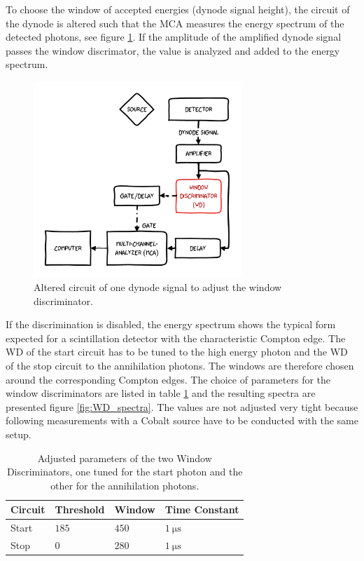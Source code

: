 \documentclass[
	paper=A4,
	parskip=full,
	chapterprefix=true,
	11pt,
	headings=normal,
	bibliography=totoc,
	listof=totoc,
	titlepage=on,
]{scrreprt}
\begin{document}
To choose the window of accepted energies (dynode signal height), the circuit of the dynode is altered such that the MCA measures the energy spectrum of the detected photons, see figure \ref{fig:WD_circuit}. If the amplitude of the amplified dynode signal passes the window discrimator, the value is analyzed and added to the energy spectrum. 
 
\begin{figure}[h]
 	\centering
 	\includegraphics[width=0.7\textwidth]{aufbau_wd}
 	\caption{Altered circuit of one dynode signal to adjust the window discriminator.}
	\label{fig:WD_circuit}
\end{figure}
 
If the discrimination is disabled, the energy spectrum shows the typical form expected for a scintillation detector with the characteristic Compton edge. The WD of the start circuit has to be tuned to the high energy photon and the WD of the stop circuit to the annihilation photons. The windows are therefore chosen around the corresponding Compton edges. The choice of parameters for the window discriminators are listed in table \ref{tbl:WD_values} and the resulting spectra are presented figure \ref{fig:WD_spectra}. The values are not adjusted very tight because following measurements with a Cobalt source have to be conducted with the same setup.

\begin{table}[htbp]
	\centering
	\begin{tabular}{ 
			l
			l
			l
			l
		}
		\toprule
		{Circuit} & {Threshold} & {Window} & {Time Constant} \\ 
		\midrule
		Start & $185$ & $450$ & $\SI{1}{\micro\second}$ \\
		Stop & $0$ & $280$ & $\SI{1}{\micro\second}$ \\
		\bottomrule
	\end{tabular}
	\caption{Adjusted parameters of the two Window Discriminators, one tuned for the start photon and the other for the annihilation photons.}
	\label{tbl:WD_values}
\end{table}
\end{document}
